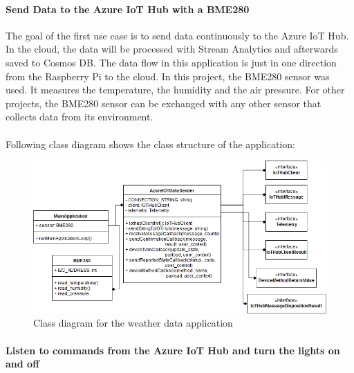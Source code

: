 \documentclass[a4paper]{article}
\begin{document}
			\paragraph{Send Data to the Azure IoT Hub with a BME280}
			
			The goal of the first use case is to send data continuously to the Azure IoT Hub.
			In the cloud, the data will be processed with Stream Analytics and afterwards saved to Cosmos DB.
			The data flow in this application is just in one direction from the Raspberry Pi to the cloud.
			In this project, the BME280 sensor was used.
			It measures the temperature, the humidity and the air pressure.
			For other projects, the BME280 sensor can be exchanged with any other sensor that collects data from its environment.
			\\
			\\
			Following class diagram shows the class structure of the application:
			
			\begin{figure}[!htb]
				\centering
				\includegraphics[width=\textwidth]{img/raspberry_bme280_application.png}
				\caption{Class diagram for the weather data application}
				\label{fig:raspibme280class}
			\end{figure}
			
			\newpage
			
			\paragraph{Listen to commands from the Azure IoT Hub and turn the lights on and off}
\end{document}
